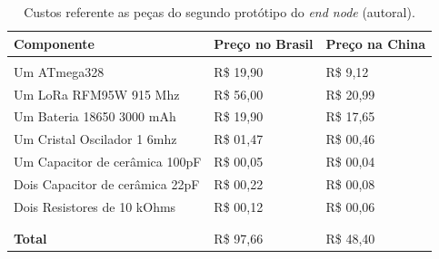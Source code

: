 \begin{table}[H]
  \centering 
  \scalebox{1} {
    \begin{tabular}{l | l | l}
    \textbf{Componente}&\textbf{Preço no Brasil}&\textbf{Preço na China}\\[5pt] \hline
    &&\\
    Um ATmega328&R\$ 19,90&R\$ 9,12 \\[5pt]
    Um LoRa RFM95W 915 Mhz&R\$ 56,00&R\$ 20,99 \\[5pt]
    Um Bateria 18650 3000 mAh&R\$ 19,90 &R\$ 17,65 \\[5pt]
    Um Cristal Oscilador 1 6mhz&R\$ 01,47&R\$ 00,46 \\[5pt]
    Um Capacitor de cerâmica 100pF&R\$ 00,05&R\$ 00,04 \\[5pt]
    Dois Capacitor de cerâmica 22pF&R\$ 00,22&R\$ 00,08 \\[5pt]
    Dois Resistores de 10 kOhms&R\$ 00,12&R\$ 00,06 \\
    &&\\ \hline
    &&\\
    \textbf{Total}&R\$ 97,66&R\$ 48,40 \\[5pt]
    \end{tabular}
  }
  \caption{Custos referente as peças do segundo protótipo do \textit{end node} (autoral).}
  \label{tab:costs-2-proto}
\end{table}
  